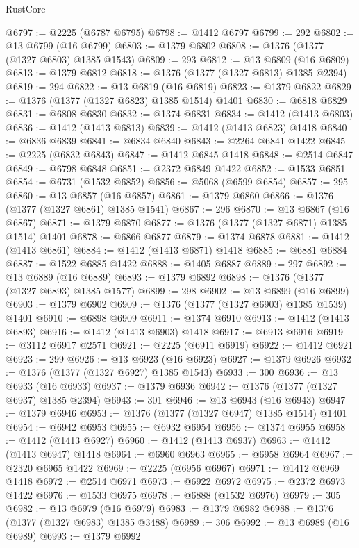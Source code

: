 \begin{lexlean}{RustCore}
\begin{coremodule}
@6797 := @2225 (@6787 @6795)
@6798 := @1412 @6797
@6799 := 292
@6802 := @13 @6799 (@16 @6799)
@6803 := @1379 @6802
@6808 := @1376 (@1377 (@1327 @6803) @1385 @1543)
@6809 := 293
@6812 := @13 @6809 (@16 @6809)
@6813 := @1379 @6812
@6818 := @1376 (@1377 (@1327 @6813) @1385 @2394)
@6819 := 294
@6822 := @13 @6819 (@16 @6819)
@6823 := @1379 @6822
@6829 := @1376 (@1377 (@1327 @6823) @1385 @1514) @1401
@6830 := @6818 @6829
@6831 := @6808 @6830
@6832 := @1374 @6831
@6834 := @1412 (@1413 @6803)
@6836 := @1412 (@1413 @6813)
@6839 := @1412 (@1413 @6823) @1418
@6840 := @6836 @6839
@6841 := @6834 @6840
@6843 := @2264 @6841 @1422
@6845 := @2225 (@6832 @6843)
@6847 := @1412 @6845 @1418
@6848 := @2514 @6847
@6849 := @6798 @6848
@6851 := @2372 @6849 @1422
@6852 := @1533 @6851
@6854 := @6731 (@1532 @6852)
@6856 := @5068 (@6599 @6854)
@6857 := 295
@6860 := @13 @6857 (@16 @6857)
@6861 := @1379 @6860
@6866 := @1376 (@1377 (@1327 @6861) @1385 @1541)
@6867 := 296
@6870 := @13 @6867 (@16 @6867)
@6871 := @1379 @6870
@6877 := @1376 (@1377 (@1327 @6871) @1385 @1514) @1401
@6878 := @6866 @6877
@6879 := @1374 @6878
@6881 := @1412 (@1413 @6861)
@6884 := @1412 (@1413 @6871) @1418
@6885 := @6881 @6884
@6887 := @1522 @6885 @1422
@6888 := @1405 @6887
@6889 := 297
@6892 := @13 @6889 (@16 @6889)
@6893 := @1379 @6892
@6898 := @1376 (@1377 (@1327 @6893) @1385 @1577)
@6899 := 298
@6902 := @13 @6899 (@16 @6899)
@6903 := @1379 @6902
@6909 := @1376 (@1377 (@1327 @6903) @1385 @1539) @1401
@6910 := @6898 @6909
@6911 := @1374 @6910
@6913 := @1412 (@1413 @6893)
@6916 := @1412 (@1413 @6903) @1418
@6917 := @6913 @6916
@6919 := @3112 @6917 @2571
@6921 := @2225 (@6911 @6919)
@6922 := @1412 @6921
@6923 := 299
@6926 := @13 @6923 (@16 @6923)
@6927 := @1379 @6926
@6932 := @1376 (@1377 (@1327 @6927) @1385 @1543)
@6933 := 300
@6936 := @13 @6933 (@16 @6933)
@6937 := @1379 @6936
@6942 := @1376 (@1377 (@1327 @6937) @1385 @2394)
@6943 := 301
@6946 := @13 @6943 (@16 @6943)
@6947 := @1379 @6946
@6953 := @1376 (@1377 (@1327 @6947) @1385 @1514) @1401
@6954 := @6942 @6953
@6955 := @6932 @6954
@6956 := @1374 @6955
@6958 := @1412 (@1413 @6927)
@6960 := @1412 (@1413 @6937)
@6963 := @1412 (@1413 @6947) @1418
@6964 := @6960 @6963
@6965 := @6958 @6964
@6967 := @2320 @6965 @1422
@6969 := @2225 (@6956 @6967)
@6971 := @1412 @6969 @1418
@6972 := @2514 @6971
@6973 := @6922 @6972
@6975 := @2372 @6973 @1422
@6976 := @1533 @6975
@6978 := @6888 (@1532 @6976)
@6979 := 305
@6982 := @13 @6979 (@16 @6979)
@6983 := @1379 @6982
@6988 := @1376 (@1377 (@1327 @6983) @1385 @3488)
@6989 := 306
@6992 := @13 @6989 (@16 @6989)
@6993 := @1379 @6992

\end{coremodule}
\end{lexlean}
